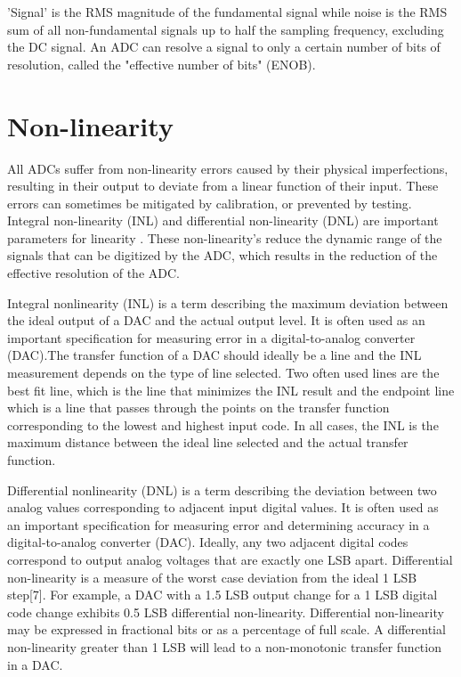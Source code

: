 \par
\hspace{0.5cm} 'Signal' is the RMS magnitude of the fundamental signal while noise is the RMS sum of all non-fundamental signals up to half the sampling frequency, excluding the DC signal. An ADC can resolve a signal to only a certain number of bits of resolution, called the "effective number of bits" (ENOB). \\


\section{Non-linearity}

\par
\hspace{1.2cm} All ADCs suffer from non-linearity errors caused by their physical imperfections, resulting in their output to deviate from a linear function of their input. These errors can sometimes be mitigated by calibration, or prevented by testing. Integral non-linearity (INL) and differential non-linearity (DNL) are important parameters for linearity . These non-linearity’s reduce the dynamic range of the signals that can be digitized by the ADC, which results in the reduction of the effective resolution of the ADC.\\

\par
\hspace{0.5cm} Integral nonlinearity (INL) is a term describing the maximum deviation between the ideal output of a DAC and the actual output level. It is often used as an important specification for measuring error in a digital-to-analog converter (DAC).The transfer function of a DAC should ideally be a line and the INL measurement depends on the type of line selected. Two often used lines are the best fit line, which is the line that minimizes the INL result and the endpoint line which is a line that passes through the points on the transfer function corresponding to the lowest and highest input code. In all cases, the INL is the maximum distance between the ideal line selected and the actual transfer function.\\


\par
\hspace{0.5cm} Differential nonlinearity (DNL) is a term describing the deviation between two analog values corresponding to adjacent input digital values. It is often used as an important specification for measuring error and determining accuracy in a digital-to-analog converter (DAC). Ideally, any two adjacent digital codes correspond to output analog voltages that are exactly one LSB apart. Differential non-linearity is a measure of the worst case deviation from the ideal 1 LSB step[7]. For example, a DAC with a 1.5 LSB output change for a 1 LSB digital code change exhibits 0.5 LSB differential non-linearity. Differential non-linearity may be expressed in fractional bits or as a percentage of full scale. A differential non-linearity greater than 1 LSB will lead to a non-monotonic transfer function in a DAC.\\



